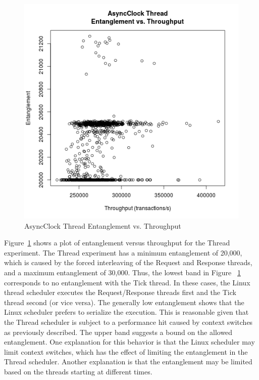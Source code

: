 \begin{figure}[H]
\center
\includegraphics[height=.4\textheight]{async_thread_throughput_entanglement.png}
\caption{AsyncClock Thread Entanglement vs. Throughput}
\label{async_thread_throughput_entanglement}
\end{figure}

Figure~\ref{async_thread_throughput_entanglement} shows a plot of entanglement versus throughput for the Thread experiment.
The Thread experiment has a minimum entanglement of 20,000, which is caused by the forced interleaving of the Request and Response threads, and a maximum entanglement of 30,000.
Thus, the lowest band in Figure ~\ref{async_thread_throughput_entanglement} corresponds to no entanglement with the Tick thread.
In these cases, the Linux thread scheduler executes the Request/Response threads first and the Tick thread second (or vice versa).
The generally low entanglement shows that the Linux scheduler prefers to serialize the execution.
This is reasonable given that the Thread scheduler is subject to a performance hit caused by context switches as previously described.
The upper band suggests a bound on the allowed entanglement.
One explanation for this behavior is that the Linux scheduler may limit context switches, which has the effect of limiting the entanglement in the Thread scheduler.
Another explanation is that the entanglement may be limited based on the threads starting at different times.

